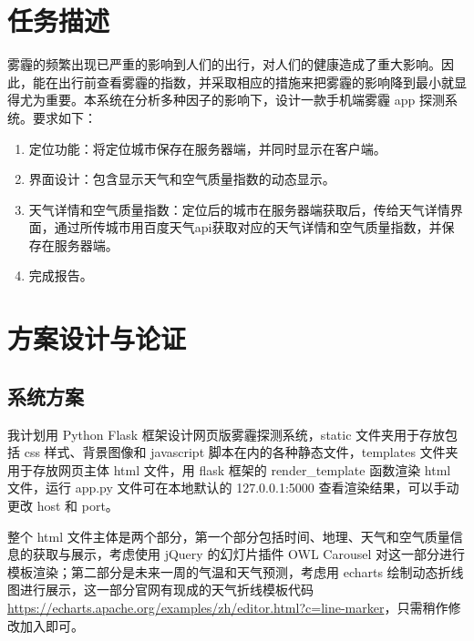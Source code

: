 \documentclass[12pt,AutoFakeBold]{article}
\begin{document}
\maketitle
\setcounter{tocdepth}{2}

\tableofcontents  %

\makeatletter
\begin{center}
    \LARGE \textbf{\textsf{\@problem}}
\end{center}
\makeatother


\section{任务描述}

雾霾的频繁出现已严重的影响到人们的出行，对人们的健康造成了重大影响。因此，能在出行前查看雾霾的指数，并采取相应的措施来把雾霾的影响降到最小就显得尤为重要。本系统在分析多种因子的影响下，设计一款手机端雾霾 app 探测系统。要求如下：

\begin{enumerate}[1.]
\item 定位功能：将定位城市保存在服务器端，并同时显示在客户端。
\item 界面设计：包含显示天气和空气质量指数的动态显示。
\item 天气详情和空气质量指数：定位后的城市在服务器端获取后，传给天气详情界面，通过所传城市用百度天气api获取对应的天气详情和空气质量指数，并保存在服务器端。
\item 完成报告。
\end{enumerate}

\section{方案设计与论证}

\subsection{系统方案}

我计划用 Python Flask 框架设计网页版雾霾探测系统，static 文件夹用于存放包括 css 样式、背景图像和 javascript 脚本在内的各种静态文件，templates 文件夹用于存放网页主体 html 文件，用 flask 框架的 render\_template 函数渲染 html 文件，运行 app.py 文件可在本地默认的 127.0.0.1:5000 查看渲染结果，可以手动更改 host 和 port。

整个 html 文件主体是两个部分，第一个部分包括时间、地理、天气和空气质量信息的获取与展示，考虑使用 jQuery 的幻灯片插件 OWL Carousel 对这一部分进行模板渲染；第二部分是未来一周的气温和天气预测，考虑用 echarts 绘制动态折线图进行展示，这一部分官网有现成的天气折线模板代码 \url{https://echarts.apache.org/examples/zh/editor.html?c=line-marker}，只需稍作修改加入即可。
\end{document}
